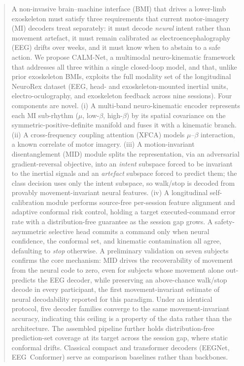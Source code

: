 \documentclass[conference]{IEEEtran}
\begin{document}
\begin{abstract}
A non-invasive brain--machine interface (BMI) that drives a lower-limb exoskeleton
must satisfy three requirements that current motor-imagery (MI) decoders treat
separately: it must decode \emph{neural} intent rather than movement artefact, it
must remain calibrated as electroencephalography (EEG) drifts over weeks, and it
must know when to abstain to a safe action. We propose CALM-Net, a multimodal
neuro-kinematic framework that addresses all three within a single closed-loop
model, and that, unlike prior exoskeleton BMIs, exploits the full modality set of
the longitudinal NeuroRex dataset (EEG, head- and exoskeleton-mounted inertial
units, electro-oculography, and exoskeleton feedback across nine sessions). Four
components are novel. (i) A multi-band neuro-kinematic encoder represents each MI
sub-rhythm ($\mu$, low-$\beta$, high-$\beta$) by its spatial covariance on the
symmetric-positive-definite manifold and fuses it with a kinematic branch. (ii) A
cross-frequency coupling attention (XFCA) models $\mu$--$\beta$ interaction, a known
correlate of motor imagery. (iii) A motion-invariant disentanglement (MID) module
splits the representation, via an adversarial gradient-reversal objective, into an
\emph{intent} subspace forced to be invariant to the inertial signals and an
\emph{artefact} subspace forced to predict them; the class decision uses only the
intent subspace, so walk/stop is decoded from provably movement-invariant neural
features. (iv) A longitudinal self-calibration module performs source-free
per-session feature alignment and adaptive conformal risk control, holding a target
executed-command error rate with a distribution-free guarantee as the session gap
grows. A safety-asymmetric selective head commits a command only when neural
confidence, the conformal set, and kinematic contamination all agree, defaulting to
\emph{stop} otherwise. A preliminary validation on seven subjects confirms the core
mechanism: MID drives the recoverability of movement from the neural code to zero,
even for subjects whose movement alone out-predicts the EEG decoder, while
preserving an above-chance walk/stop decode in every participant, the first
movement-invariant estimate of neural decodability reported for this paradigm. Under
an identical protocol, five decoder families converge to the same movement-invariant
accuracy, indicating this ceiling is a property of the data rather than the
architecture. The
assembled pipeline further holds distribution-free prediction-set coverage at its
target across the session gap, where static conformal drifts. Classical compact and
transformer decoders (EEGNet, EEG~Conformer) serve as comparison baselines rather
than backbones.
\end{abstract}
\end{document}
